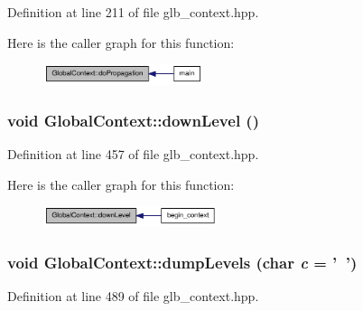 Definition at line 211 of file glb\_\-context.hpp.

Here is the caller graph for this function:\nopagebreak
\begin{figure}[H]
\begin{center}
\leavevmode
\includegraphics[width=133pt]{class_global_context_a8f6d2fae9cd8687798b175ad75ba7974_icgraph}
\end{center}
\end{figure}
\hypertarget{class_global_context_acdb15ae187d6c84b42851ddb94191eec}{
\subsubsection[{downLevel}]{\setlength{\rightskip}{0pt plus 5cm}void GlobalContext::downLevel ()}}
\label{class_global_context_acdb15ae187d6c84b42851ddb94191eec}


Definition at line 457 of file glb\_\-context.hpp.

Here is the caller graph for this function:\nopagebreak
\begin{figure}[H]
\begin{center}
\leavevmode
\includegraphics[width=145pt]{class_global_context_acdb15ae187d6c84b42851ddb94191eec_icgraph}
\end{center}
\end{figure}
\hypertarget{class_global_context_a016ede40f469516e58cdc0a720d77bd7}{
\subsubsection[{dumpLevels}]{\setlength{\rightskip}{0pt plus 5cm}void GlobalContext::dumpLevels (char {\em c} = {\ttfamily '~'})}}
\label{class_global_context_a016ede40f469516e58cdc0a720d77bd7}


Definition at line 489 of file glb\_\-context.hpp.


